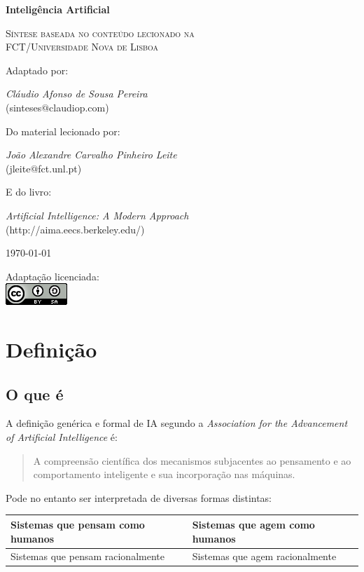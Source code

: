 \documentclass[]{report}
\begin{document}
\begin{titlepage}
	\centering
	\vspace{5cm}
	{\huge\bfseries Inteligência Artificial\par}
	\vspace{1cm}
	{\scshape\Large Síntese baseada no conteúdo lecionado na\\
	 FCT/Universidade Nova de Lisboa\par}
	\vspace{2cm}
	Adaptado por:\\
	{\Large \textit{Cláudio Afonso de Sousa Pereira}\\
	(sinteses$\text{@}$claudiop$.$com)\par}
	\vspace{1cm}
	Do material lecionado por:\\
	{\Large \textit{João Alexandre Carvalho Pinheiro Leite}\\
	(jleite$\text{@}$fct$.$unl$.$pt)\par}
	\vspace{1cm}
	E do livro:\\
	{\Large \textit{Artificial Intelligence: A Modern Approach}\\
	(http://aima.eecs.berkeley.edu/)\par}
	\vspace{1cm}
	{\large \today\par}
	\vfill
	Adaptação licenciada:\\
	\href{http://creativecommons.org/licenses/by-sa/4.0/}{\includegraphics[scale=0.8]{ccbysa.png}}
\end{titlepage}
\tableofcontents
\chapter{Definição}
\section{O que é}
A definição genérica e formal de IA segundo a \textit{Association for the Advancement of Artificial Intelligence} é:
\begin{quote}
A compreensão científica dos mecanismos subjacentes ao pensamento e ao comportamento inteligente e sua incorporação nas máquinas.
\end{quote}
Pode no entanto ser interpretada de diversas formas distintas:
\begin{table}[htbp]
\begin{tabular}{l | l}
Sistemas que pensam como humanos & Sistemas que agem como humanos \\ \hline
Sistemas que pensam racionalmente & Sistemas que agem racionalmente \\
\end{tabular}
\end{table}
\end{document}
